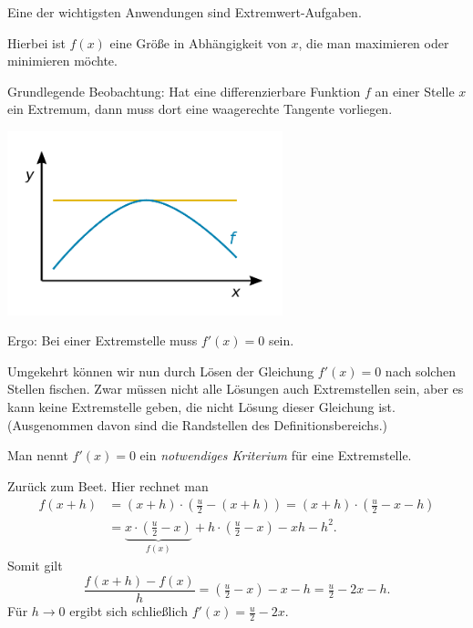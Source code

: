 \documentclass{beamer}
\begin{document}
\begin{frame}
Eine der wichtigsten Anwendungen sind Extremwert-Aufgaben.\pause

\vspace{0.8em}
Hierbei ist $f(x)$ eine Größe in Abhängigkeit von $x$, die
man maximieren oder minimieren möchte.
\end{frame}

\begin{frame}[t]
\vspace{1em}
Grundlegende Beobachtung: Hat eine differenzierbare Funktion $f$ an
einer Stelle $x$ ein Extremum, dann muss dort eine waagerechte
Tangente vorliegen.
\pause

\vspace{-1em}
\begin{center}
\includegraphics[width=80mm]{img/Maximum.pdf}
\end{center}
\end{frame}

\begin{frame}
Ergo: Bei einer Extremstelle muss $f'(x)=0$ sein.
\pause

\vspace{0.8em}
Umgekehrt können wir nun durch Lösen der Gleichung $f'(x)=0$ nach
solchen Stellen fischen. Zwar müssen nicht alle Lösungen auch
Extremstellen sein, aber es kann keine Extremstelle geben, die nicht
Lösung dieser Gleichung ist. {\footnotesize
(Ausgenommen davon sind die Randstellen des Definitionsbereichs.)}
\pause

\vspace{0.8em}
Man nennt $f'(x)=0$ ein \emph{notwendiges Kriterium} für eine
Extremstelle.
\end{frame}

\begin{frame}
Zurück zum Beet.\pause{} Hier rechnet man
\begin{align*}f(x+h) &= (x+h)\cdot(\tfrac{u}{2}-(x+h)) = (x+h)\cdot(\tfrac{u}{2}-x-h)\\
&= \underbrace{x\cdot(\tfrac{u}{2}-x)}_{f(x)} + h\cdot (\tfrac{u}{2}-x) - xh - h^2.
\end{align*}\pause
Somit gilt
\[\frac{f(x+h)-f(x)}{h} = (\tfrac{u}{2}-x) - x - h = \tfrac{u}{2}-2x-h.
\]\pause
Für $h\to 0$ ergibt sich schließlich $f'(x) = \tfrac{u}{2}-2x$.
\end{frame}
\end{document}
